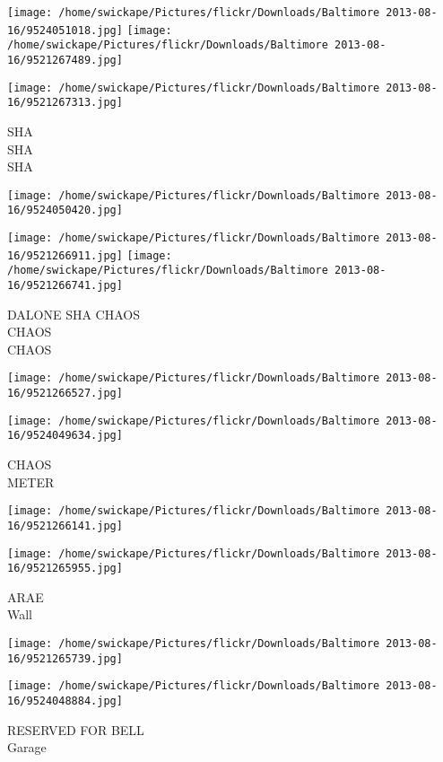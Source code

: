 \documentclass[10pt,letterpaper]{article}
\begin{document}
\texttt{[image: /home/swickape/Pictures/flickr/Downloads/Baltimore 2013-08-16/9524051018.jpg]}
\texttt{[image: /home/swickape/Pictures/flickr/Downloads/Baltimore 2013-08-16/9521267489.jpg]}

\texttt{[image: /home/swickape/Pictures/flickr/Downloads/Baltimore 2013-08-16/9521267313.jpg]}

SHA\\
SHA\\
SHA
\pagebreak

\texttt{[image: /home/swickape/Pictures/flickr/Downloads/Baltimore 2013-08-16/9524050420.jpg]}

\vspace{0.25in}
\texttt{[image: /home/swickape/Pictures/flickr/Downloads/Baltimore 2013-08-16/9521266911.jpg]}
\texttt{[image: /home/swickape/Pictures/flickr/Downloads/Baltimore 2013-08-16/9521266741.jpg]}

DALONE SHA CHAOS\\
CHAOS\\
CHAOS
\pagebreak

\texttt{[image: /home/swickape/Pictures/flickr/Downloads/Baltimore 2013-08-16/9521266527.jpg]}

\vspace{0.25in}
\texttt{[image: /home/swickape/Pictures/flickr/Downloads/Baltimore 2013-08-16/9524049634.jpg]}

CHAOS\\
METER
\pagebreak

\texttt{[image: /home/swickape/Pictures/flickr/Downloads/Baltimore 2013-08-16/9521266141.jpg]}

\vspace{0.25in}
\texttt{[image: /home/swickape/Pictures/flickr/Downloads/Baltimore 2013-08-16/9521265955.jpg]}

ARAE\\
Wall
\pagebreak

\texttt{[image: /home/swickape/Pictures/flickr/Downloads/Baltimore 2013-08-16/9521265739.jpg]}

\vspace{0.25in}
\texttt{[image: /home/swickape/Pictures/flickr/Downloads/Baltimore 2013-08-16/9524048884.jpg]}

RESERVED FOR BELL\\
Garage
\pagebreak
\end{document}
